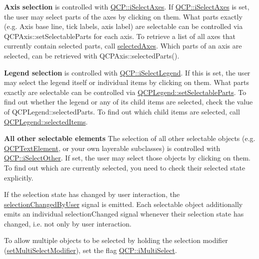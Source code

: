 {\bfseries Axis selection} is controlled with \hyperlink{namespace_q_c_p_a2ad6bb6281c7c2d593d4277b44c2b037a7f49c26c8cf12373ac867d63737c62b9}{Q\+C\+P\+::i\+Select\+Axes}. If \hyperlink{namespace_q_c_p_a2ad6bb6281c7c2d593d4277b44c2b037a7f49c26c8cf12373ac867d63737c62b9}{Q\+C\+P\+::i\+Select\+Axes} is set, the user may select parts of the axes by clicking on them. What parts exactly (e.\+g. Axis base line, tick labels, axis label) are selectable can be controlled via Q\+C\+P\+Axis\+::set\+Selectable\+Parts for each axis. To retrieve a list of all axes that currently contain selected parts, call \hyperlink{class_q_custom_plot_a7e6b07792b1cb2c31681596582d14dbe}{selected\+Axes}. Which parts of an axis are selected, can be retrieved with Q\+C\+P\+Axis\+::selected\+Parts().

{\bfseries Legend selection} is controlled with \hyperlink{namespace_q_c_p_a2ad6bb6281c7c2d593d4277b44c2b037a2b0800bffd93fc13090670eabf0fe1db}{Q\+C\+P\+::i\+Select\+Legend}. If this is set, the user may select the legend itself or individual items by clicking on them. What parts exactly are selectable can be controlled via \hyperlink{class_q_c_p_legend_a9ce60aa8bbd89f62ae4fa83ac6c60110}{Q\+C\+P\+Legend\+::set\+Selectable\+Parts}. To find out whether the legend or any of its child items are selected, check the value of Q\+C\+P\+Legend\+::selected\+Parts. To find out which child items are selected, call \hyperlink{class_q_c_p_legend_ac7d9e567d5c551e09cd9bcc4306c5532}{Q\+C\+P\+Legend\+::selected\+Items}.

{\bfseries All other selectable elements} The selection of all other selectable objects (e.\+g. \hyperlink{class_q_c_p_text_element}{Q\+C\+P\+Text\+Element}, or your own layerable subclasses) is controlled with \hyperlink{namespace_q_c_p_a2ad6bb6281c7c2d593d4277b44c2b037a2ba96f62595bc22603da0e575b589a83}{Q\+C\+P\+::i\+Select\+Other}. If set, the user may select those objects by clicking on them. To find out which are currently selected, you need to check their selected state explicitly.

If the selection state has changed by user interaction, the \hyperlink{class_q_custom_plot_a500c64a109bc773c973ad274f2fa4190}{selection\+Changed\+By\+User} signal is emitted. Each selectable object additionally emits an individual selection\+Changed signal whenever their selection state has changed, i.\+e. not only by user interaction.

To allow multiple objects to be selected by holding the selection modifier (\hyperlink{class_q_custom_plot_a8fc96e3b5138a06759a2a90c166df516}{set\+Multi\+Select\+Modifier}), set the flag \hyperlink{namespace_q_c_p_a2ad6bb6281c7c2d593d4277b44c2b037ad0378264fda468cecdab409dde4542ad}{Q\+C\+P\+::i\+Multi\+Select}.

